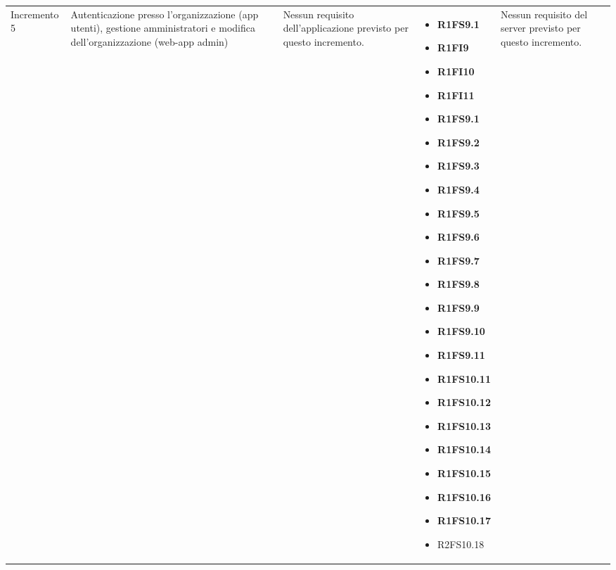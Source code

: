 {\begin{longtable}{C{2.5cm} C{3.2cm} C{2.8cm} C{2.8cm} C{2.8cm}}
Incremento 5 & Autenticazione presso l'organizzazione (app utenti), gestione amministratori  e modifica dell'organizzazione (web-app admin) &
    Nessun requisito dell'applicazione previsto per questo incremento.
    & \begin{itemize} 
    \item[ ] \textbf{R1FS9.1}
    \item[ ] \textbf{R1FI9}
    \item[ ] \textbf{R1FI10}
    \item[ ] \textbf{R1FI11}
    \item[ ] \textbf{R1FS9.1}
    \item[ ] \textbf{R1FS9.2}
    \item[ ] \textbf{R1FS9.3}
    \item[ ] \textbf{R1FS9.4}
    \item[ ] \textbf{R1FS9.5}
    \item[ ] \textbf{R1FS9.6}
    \item[ ] \textbf{R1FS9.7}
    \item[ ] \textbf{R1FS9.8}
    \item[ ] \textbf{R1FS9.9}
    \item[ ] \textbf{R1FS9.10}
    \item[ ] \textbf{R1FS9.11}
    \item[ ] \textbf{R1FS10.11}
    \item[ ] \textbf{R1FS10.12}
    \item[ ] \textbf{R1FS10.13}
    \item[ ] \textbf{R1FS10.14}
    \item[ ] \textbf{R1FS10.15}
    \item[ ] \textbf{R1FS10.16}
    \item[ ] \textbf{R1FS10.17}
    \item[ ] R2FS10.18
\end{itemize} &
    Nessun requisito del server previsto per questo incremento. \\


\end{longtable}}
